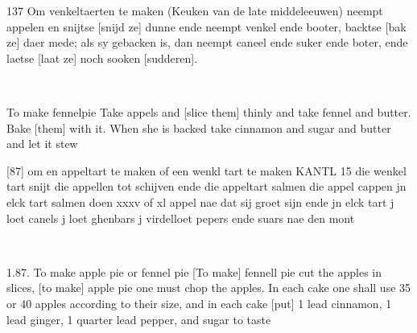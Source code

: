 \documentclass[a4paper]{article}
\begin{document}
\medskip
\begin{minipage}{.45\textwidth}
137 Om venkeltaerten te maken (Keuken van de late middeleeuwen) 
neempt appelen en snijtse [snijd ze] dunne ende neempt venkel ende booter, backtse [bak ze] daer mede; als sy gebacken is, dan neempt caneel ende suker ende boter, ende laetse [laat ze] noch sooken [sudderen].	\cite{KLM}
\end{minipage}
\begin{minipage}{0.05\textwidth}
\ \ \ 
\end{minipage}
\begin{minipage}{.45\textwidth}
To make fennelpie
Take appels and [slice them] thinly and take fennel and butter. Bake [them] with it. When she is backed take cinnamon and sugar and butter and let it stew\cite{KLM}
\end{minipage}

\medskip
\begin{minipage}{.45\textwidth}
 [87] om en appeltart te maken of een wenkl tart te maken KANTL 15
die wenkel tart snijt die appellen tot schijven ende die appeltart salmen die appel cappen jn elck tart salmen doen xxxv of xl appel nae dat sij groet sijn ende jn elck tart j loet canels j loet ghenbars j virdelloet pepers ende suars nae den mont 	\cite{KANTL15}
\end{minipage}
\begin{minipage}{0.05\textwidth}
\ \ \ 
\end{minipage}
\begin{minipage}{.45\textwidth}
1.87. To make apple pie or fennel pie
[To make] fennell pie cut the apples in slices, [to make] apple pie one must chop the apples. In each cake one shall use 35 or 40 apples according to their size, and in each cake [put] 1 lead cinnamon, 1 lead ginger, 1 quarter lead pepper, and sugar to taste \cite{KANTL15}
\end{minipage}
\end{document}
